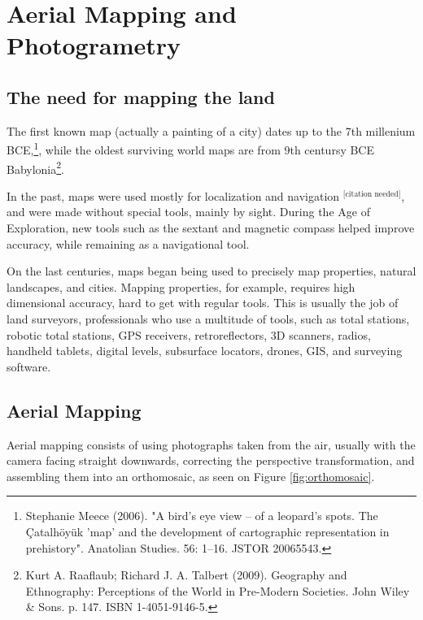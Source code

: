 

\chapter{Aerial Mapping and Photogrametry} \label{chap:2}



\section{The need for mapping the land}
The first known map (actually a painting of a city) dates up to the 7th millenium BCE,\footnote{Stephanie Meece (2006). "A bird's eye view – of a leopard's spots. The Çatalhöyük 'map' and the development of cartographic representation in prehistory". Anatolian Studies. 56: 1–16. JSTOR 20065543.}, while the oldest surviving world maps are from 9th centursy BCE Babylonia\footnote{ Kurt A. Raaflaub; Richard J. A. Talbert (2009). Geography and Ethnography: Perceptions of the World in Pre-Modern Societies. John Wiley \& Sons. p. 147. ISBN 1-4051-9146-5.}.

In the past, maps were used mostly for localization and navigation $^{\text{[citation needed]}}$, and were made without special tools, mainly by sight. During the Age of Exploration, new tools such as the sextant and magnetic compass helped improve accuracy, while remaining as a navigational tool.

On the last centuries, maps began being used to precisely map properties, natural landscapes, and cities. Mapping properties, for example, requires high dimensional accuracy, hard to get with regular tools. This is usually the job of land surveyors, professionals who use a multitude of tools, such as total stations, robotic total stations, GPS receivers, retroreflectors, 3D scanners, radios, handheld tablets, digital levels, subsurface locators, drones, GIS, and surveying software.


\section{Aerial Mapping}
Aerial mapping consists of using photographs taken from the air, usually with the camera facing straight downwards, correcting the perspective transformation, and assembling them into an orthomosaic, as seen on Figure \ref{fig:orthomosaic}.

